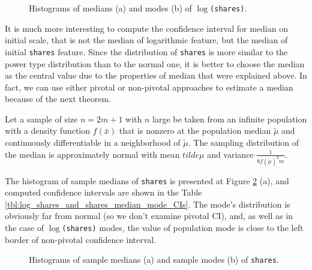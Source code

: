 \begin{figure}[h]
\begin{minipage}[h]{0.49\linewidth}
\end{minipage}
\hfill
\begin{minipage}[h]{0.49\linewidth}
\end{minipage}
\caption{Histograms of medians (a) and modes (b) of \texttt{$\log$(shares)}.}
\label{img:hist_medians_modes_log_shares}
\end{figure}

It is much more interesting to compute the confidence interval for median on initial scale, that is not  the median of logarithmic feature, but  the median of initial \texttt{shares} feature. Since the distribution of \texttt{shares} is more similar  to the power type distribution than to the normal one, it is better to choose the median as the central value due to the properties of median that were explained above.
In fact, we can use either pivotal or non-pivotal approaches to estimate a median because of the next theorem.

\begin{theorem}
Let a sample of size $n = 2m + 1$ with $n$ large be taken from an infinite population with a density
function $f(\bar{x})$ that is nonzero at the population median $\tilde{\mu}$ and continuously differentiable in a neighborhood of $\tilde{\mu}$. The sampling distribution of the median is approximately normal with mean $tilde{\mu}$ and variance $\frac{1}{8f(\tilde{\mu})^2 m}$.
\end{theorem}

The histogram of  sample medians  of \texttt{shares}  is presented at Figure \ref{img:hist_medians_modes_shares} (a), and computed confidence intervals are shown in the  Table  \ref{tbl:log_shares_and_shares_median_mode_CIs}. The mode's distribution is obviously far from normal (so we don't examine pivotal CI), and, as well as in the case of \texttt{$\log$(shares)} modes, the value of population mode is close to the left border of non-pivotal confidence interval. 

\begin{figure}[h]
\begin{minipage}[h]{0.49\linewidth}
\end{minipage}
\hfill
\begin{minipage}[h]{0.49\linewidth}
\end{minipage}
\caption{Histograms of sample medians (a) and sample modes (b) of \texttt{shares}.}
\label{img:hist_medians_modes_shares}
\end{figure}

